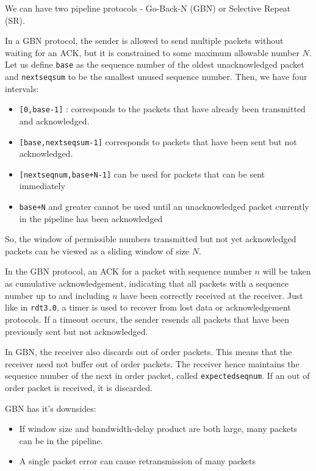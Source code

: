 \documentclass[12pt,letterpaper]{amsbook}
\theoremstyle{definition}
\begin{document}
We can have two pipeline protocols - Go-Back-N (GBN) or Selective Repeat (SR).

In a GBN protocol, the sender is  allowed to send multiple packets without waiting for an ACK, but it is constrained to some maximum allowable number $N$. Let us define \texttt{base} as the sequence number of the oldest unacknowledged packet and \texttt{nextseqsum} to be the smallest unused sequence number. Then, we have four intervals:

\begin{itemize}
  \item \texttt{[0,base-1]} : corresponds to the packets that have already been transmitted and acknowledged.
  \item \texttt{[base,nextseqsum-1]} corresponds to packets that have been sent but not acknowledged.
  \item \texttt{[nextseqnum,base+N-1]} can be used for packets that can be sent immediately
  \item \texttt{base+N} and greater cannot be used until an unacknowledged packet currently in the pipeline has been acknowledged 
\end{itemize}

So, the window of permissible numbers transmitted but not yet acknowledged packets can be viewed as a sliding window of size $N$.

In the GBN protocol, an ACK for a packet with sequence number $n$ will be taken as cumulative acknowledgement, indicating that all packets with a sequence number up to and including $n$ have been correctly received at the receiver. Just like in \texttt{rdt3.0}, a timer is used to recover from lost data or acknowledgement protocols. If a timeout occurs, the sender resends all packets that have been previously sent but not acknowledged.

In GBN, the receiver also discards out of order packets. This means that the receiver need not buffer out of order packets. The receiver hence maintains the sequence number of the next in order packet, called \texttt{expectedseqnum}. If an out of order packet is received, it is discarded.

GBN has it's downsides:

\begin{itemize}
  \item If window size and bandwidth-delay product are both large, many packets can be in the pipeline.
  \item A single packet error can cause retransmission of many packets
\end{itemize}
\end{document}
